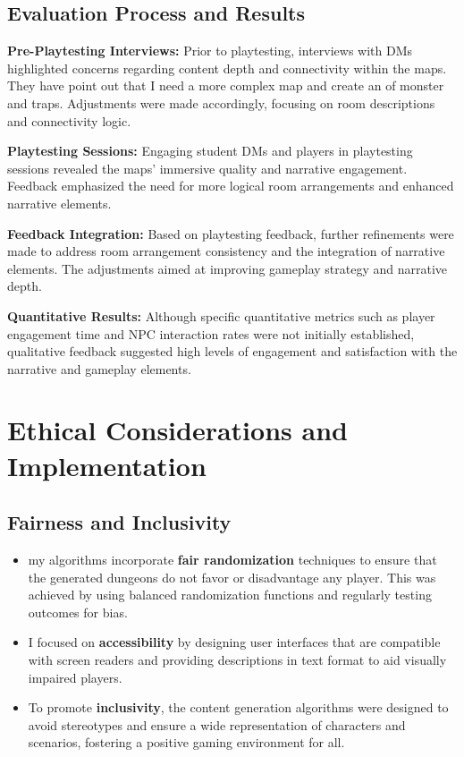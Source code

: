 \documentclass[10pt,twocolumn]{article}
\begin{document}
\subsection{Evaluation Process and Results}

\textbf{Pre-Playtesting Interviews:} Prior to playtesting, interviews with DMs highlighted concerns regarding content depth and connectivity within the maps. They have point out that I need a more complex map and create an  of monster and traps. Adjustments were made accordingly, focusing on room descriptions and connectivity logic.

\textbf{Playtesting Sessions:} Engaging student DMs and players in playtesting sessions revealed the maps' immersive quality and narrative engagement. Feedback emphasized the need for more logical room arrangements and enhanced narrative elements.

\textbf{Feedback Integration:} Based on playtesting feedback, further refinements were made to address room arrangement consistency and the integration of narrative elements. The adjustments aimed at improving gameplay strategy and narrative depth.

\textbf{Quantitative Results:} Although specific quantitative metrics such as player engagement time and NPC interaction rates were not initially established, qualitative feedback suggested high levels of engagement and satisfaction with the narrative and gameplay elements.


\section{Ethical Considerations and Implementation}

\subsection{Fairness and Inclusivity}
\begin{itemize}
    \item my algorithms incorporate \textbf{fair randomization} techniques to ensure that the generated dungeons do not favor or disadvantage any player. This was achieved by using balanced randomization functions and regularly testing outcomes for bias.
    \item I focused on \textbf{accessibility} by designing user interfaces that are compatible with screen readers and providing descriptions in text format to aid visually impaired players.
    \item To promote \textbf{inclusivity}, the content generation algorithms were designed to avoid stereotypes and ensure a wide representation of characters and scenarios, fostering a positive gaming environment for all.
\end{itemize}
\end{document}
